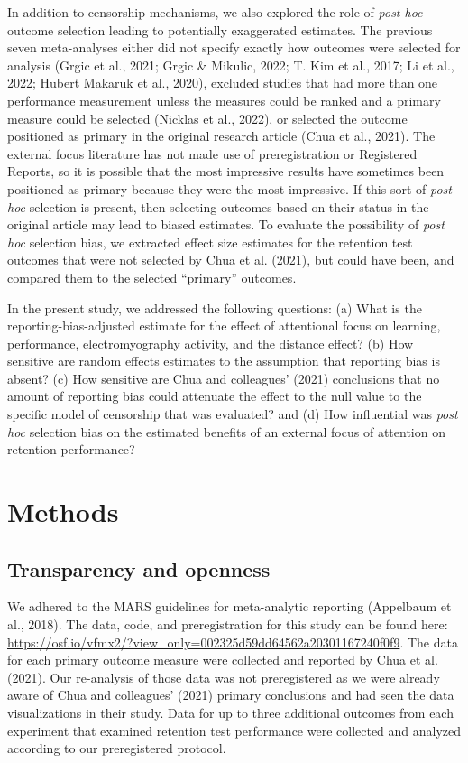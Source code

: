 \documentclass[
  man, donotrepeattitle,floatsintext]{apa7}
\begin{document}
In addition to censorship mechanisms, we also explored the role of \emph{post hoc} outcome selection leading to potentially exaggerated estimates. The previous seven meta-analyses either did not specify exactly how outcomes were selected for analysis (Grgic et al., 2021; Grgic \& Mikulic, 2022; T. Kim et al., 2017; Li et al., 2022; Hubert Makaruk et al., 2020), excluded studies that had more than one performance measurement unless the measures could be ranked and a primary measure could be selected (Nicklas et al., 2022), or selected the outcome positioned as primary in the original research article (Chua et al., 2021). The external focus literature has not made use of preregistration or Registered Reports, so it is possible that the most impressive results have sometimes been positioned as primary because they were the most impressive. If this sort of \emph{post hoc} selection is present, then selecting outcomes based on their status in the original article may lead to biased estimates. To evaluate the possibility of \emph{post hoc} selection bias, we extracted effect size estimates for the retention test outcomes that were not selected by Chua et al. (2021), but could have been, and compared them to the selected ``primary'' outcomes.

In the present study, we addressed the following questions: (a) What is the reporting-bias-adjusted estimate for the effect of attentional focus on learning, performance, electromyography activity, and the distance effect? (b) How sensitive are random effects estimates to the assumption that reporting bias is absent? (c) How sensitive are Chua and colleagues' (2021) conclusions that no amount of reporting bias could attenuate the effect to the null value to the specific model of censorship that was evaluated? and (d) How influential was \emph{post hoc} selection bias on the estimated benefits of an external focus of attention on retention performance?

\hypertarget{methods}{%
\section{Methods}\label{methods}}

\hypertarget{transparency-and-openness}{%
\subsection{Transparency and openness}\label{transparency-and-openness}}

We adhered to the MARS guidelines for meta-analytic reporting (Appelbaum et al., 2018). The data, code, and preregistration for this study can be found here: \url{https://osf.io/vfmx2/?view_only=002325d59dd64562a20301167240f0f9}. The data for each primary outcome measure were collected and reported by Chua et al. (2021). Our re-analysis of those data was not preregistered as we were already aware of Chua and colleagues' (2021) primary conclusions and had seen the data visualizations in their study. Data for up to three additional outcomes from each experiment that examined retention test performance were collected and analyzed according to our preregistered protocol.
\end{document}
